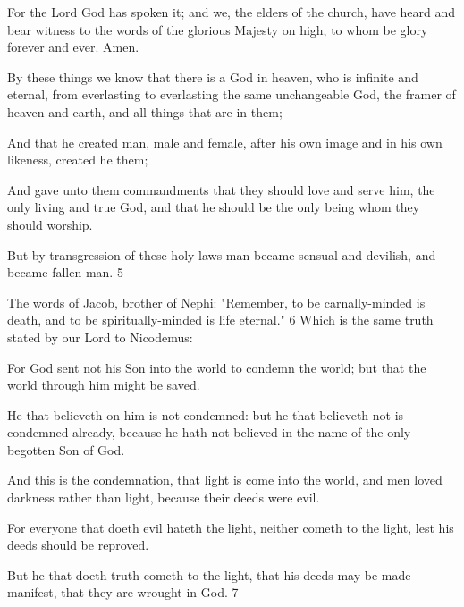 For the Lord God has spoken it; and we, the elders of the church, have heard and bear
witness to the words of the glorious Majesty on high, to whom be glory forever and ever.
Amen.

By these things we know that there is a God in heaven, who is infinite and eternal, from
everlasting to everlasting the same unchangeable God, the framer of heaven and earth, and all
things that are in them;

And that he created man, male and female, after his own image and in his own likeness,
created he them;

And gave unto them commandments that they should love and serve him, the only living and
true God, and that he should be the only being whom they should worship.

But by transgression of these holy laws man became sensual and devilish, and became fallen
man. 5

The words of Jacob, brother of Nephi: "Remember, to be carnally-minded is death, and to be
spiritually-minded is life eternal." 6 Which is the same truth stated by our Lord to
Nicodemus:

For God sent not his Son into the world to condemn the world; but that the world through
him might be saved.

He that believeth on him is not condemned: but he that believeth not is condemned already,
because he hath not believed in the name of the only begotten Son of God.

And this is the condemnation, that light is come into the world, and men loved darkness
rather than light, because their deeds were evil.

For everyone that doeth evil hateth the light, neither cometh to the light, lest his deeds should
be reproved.

But he that doeth truth cometh to the light, that his deeds may be made manifest, that they are
wrought in God. 7

